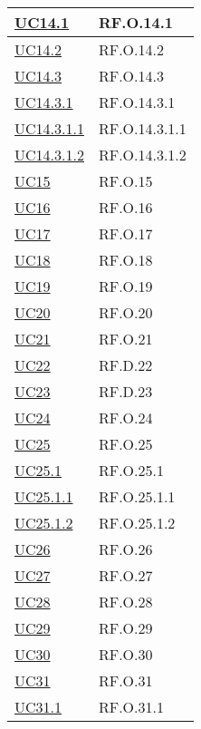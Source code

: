 \begin{adjustwidth}{-0.5cm}{-0.5cm}
\begin{longtable}{|P{4,5cm}|>{\arraybackslash}P{9cm}|}
    \hline
    \hyperref[UC14point1]{UC14.1} & RF.O.14.1 \\
    \hline
    \hyperref[UC14point2]{UC14.2} & RF.O.14.2 \\
    \hline
    \hyperref[UC14point3]{UC14.3} & RF.O.14.3 \\
    \hline
    \hyperref[UC14point3point1]{UC14.3.1} & RF.O.14.3.1 \\
    \hline
    \hyperref[UC14point3point1point1]{UC14.3.1.1} & RF.O.14.3.1.1 \\
    \hline
    \hyperref[UC14point3point1point2]{UC14.3.1.2} & RF.O.14.3.1.2 \\
    \hline
    \hyperref[UC15]{UC15} & RF.O.15 \\
    \hline
    \hyperref[UC16]{UC16} & RF.O.16 \\
    \hline
    \hyperref[UC17]{UC17} & RF.O.17 \\
    \hline
    \hyperref[UC18]{UC18} & RF.O.18 \\
    \hline
    \hyperref[UC19]{UC19} & RF.O.19 \\
    \hline
    \hyperref[UC20]{UC20} & RF.O.20 \\
    \hline
    \hyperref[UC21]{UC21} & RF.O.21 \\
    \hline
    \hyperref[UC22]{UC22} & RF.D.22 \\
    \hline
    \hyperref[UC23]{UC23} & RF.D.23 \\
    \hline
    \hyperref[UC24]{UC24} & RF.O.24 \\
    \hline
    \hyperref[UC25]{UC25} & RF.O.25 \\
    \hline
    \hyperref[UC25point1]{UC25.1} & RF.O.25.1 \\
    \hline
    \hyperref[UC25point1point1]{UC25.1.1} & RF.O.25.1.1 \\
    \hline
    \hyperref[UC25poin1point2]{UC25.1.2} & RF.O.25.1.2 \\
    \hline
    \hyperref[UC26]{UC26} & RF.O.26 \\
    \hline
    \hyperref[UC27]{UC27} & RF.O.27 \\
    \hline
    \hyperref[UC28]{UC28} & RF.O.28 \\
    \hline
    \hyperref[UC29]{UC29} & RF.O.29 \\
    \hline
    \hyperref[UC30]{UC30} & RF.O.30 \\
    \hline
    \hyperref[UC31]{UC31} & RF.O.31 \\
    \hline
    \hyperref[UC31point1]{UC31.1} & RF.O.31.1 \\
    \hline

\end{longtable}
\end{adjustwidth}
